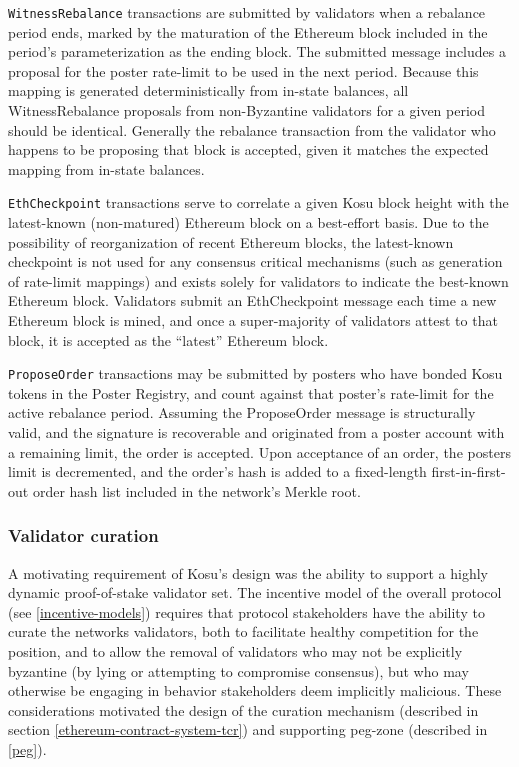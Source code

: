 \documentclass[10pt]{article}
\begin{document}
\texttt{WitnessRebalance} transactions are submitted by validators when a rebalance period ends, marked by the maturation of the Ethereum block included in the period’s parameterization as the ending block. The submitted message includes a proposal for the poster rate-limit to be used in the next period. Because this mapping is generated deterministically from in-state balances, all WitnessRebalance proposals from non-Byzantine validators for a given period should be identical. Generally the rebalance transaction from the validator who happens to be proposing that block is accepted, given it matches the expected mapping from in-state balances. 
\medskip

\texttt{EthCheckpoint} transactions serve to correlate a given Kosu block height with the latest-known (non-matured) Ethereum block on a best-effort basis. Due to the possibility of reorganization of recent Ethereum blocks, the latest-known checkpoint is not used for any consensus critical mechanisms (such as generation of rate-limit mappings) and exists solely for validators to indicate the best-known Ethereum block. Validators submit an EthCheckpoint message each time a new Ethereum block is mined, and once a super-majority of validators attest to that block, it is accepted as the ``latest'' Ethereum block. 
\medskip

\texttt{ProposeOrder} transactions may be submitted by posters who have bonded Kosu tokens in the Poster Registry, and count against that poster’s rate-limit for the active rebalance period. Assuming the ProposeOrder message is structurally valid, and the signature is recoverable and originated from a poster account with a remaining limit, the order is accepted. Upon acceptance of an order, the posters limit is decremented, and the order’s hash is added to a fixed-length first-in-first-out order hash list included in the network’s Merkle root.
\subsubsection{Validator curation}\label{tm-network-validators}
A motivating requirement of Kosu’s design was the ability to support a highly dynamic proof-of-stake validator set. The incentive model of the overall protocol (see \ref{incentive-models}) requires that protocol stakeholders have the ability to curate the networks validators, both to facilitate healthy competition for the position, and to allow the removal of validators who may not be explicitly byzantine (by lying or attempting to compromise consensus), but who may otherwise be engaging in behavior stakeholders deem implicitly malicious. These considerations motivated the design of the curation mechanism (described in section \ref{ethereum-contract-system-tcr}) and supporting peg-zone (described in \ref{peg}).
\medskip
\end{document}
